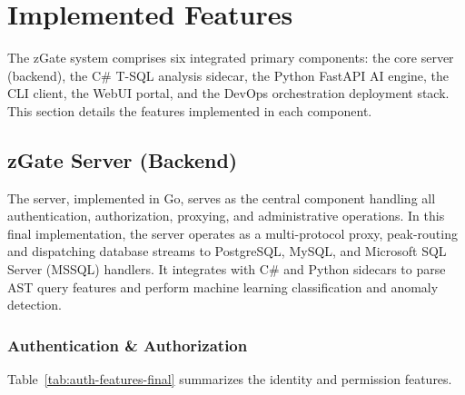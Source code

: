 \section{Implemented Features}

The zGate system comprises six integrated primary components: the core server (backend), the C\# T-SQL analysis sidecar, the Python FastAPI AI engine, the CLI client, the WebUI portal, and the DevOps orchestration deployment stack. This section details the features implemented in each component.

\subsection{zGate Server (Backend)}

The server, implemented in Go, serves as the central component handling all authentication, authorization, proxying, and administrative operations. In this final implementation, the server operates as a multi-protocol proxy, peak-routing and dispatching database streams to PostgreSQL, MySQL, and Microsoft SQL Server (MSSQL) handlers. It integrates with C\# and Python sidecars to parse AST query features and perform machine learning classification and anomaly detection.

\subsubsection{Authentication \& Authorization}

Table~\ref{tab:auth-features-final} summarizes the identity and permission features.

